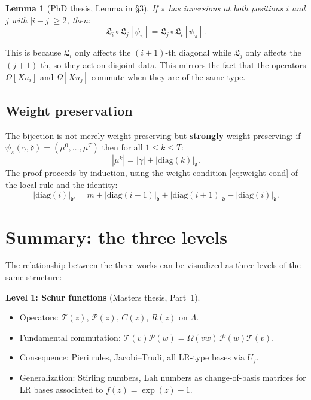 \documentclass[11pt]{article}
\newcommand{\La}{\Lambda}
\newcommand{\diag}{\mathrm{diag}}
\theoremstyle{plain}
\newtheorem{lemma}[theorem]{Lemma}
\theoremstyle{definition}
\begin{document}
\begin{lemma}[PhD thesis, Lemma in \S3]
If $\pi$ has inversions at both positions $i$ and $j$ with $|i-j| \geq 2$, then:
\[
\mathfrak{L}_i \circ \mathfrak{L}_j[\psi_\pi] = \mathfrak{L}_j \circ \mathfrak{L}_i[\psi_\pi].
\]
\end{lemma}
This is because $\mathfrak{L}_i$ only affects the $(i+1)$-th diagonal while $\mathfrak{L}_j$ only affects the $(j+1)$-th, so they act on disjoint data.  This mirrors the fact that the operators $\Omega[Xu_i]$ and $\Omega[Xu_j]$ commute when they are of the same type.

\subsection{Weight preservation}
The bijection is not merely weight-preserving but \textbf{strongly} weight-preserving: if $\psi_\pi(\gamma, \mathfrak{d}) = (\mu^0, \ldots, \mu^T)$ then for all $1 \leq k \leq T$:
\[
|\mu^k| = |\gamma| + |\diag(k)|_\mathfrak{d}.
\]
The proof proceeds by induction, using the weight condition \eqref{eq:weight-cond} of the local rule and the identity:
\[
|\diag(i)|_{\mathfrak{d}'} = m + |\diag(i-1)|_\mathfrak{d} + |\diag(i+1)|_\mathfrak{d} - |\diag(i)|_\mathfrak{d}.
\]

\section{Summary: the three levels}

The relationship between the three works can be visualized as three levels of the same structure:

\medskip

\noindent\textbf{Level 1: Schur functions} (Masters thesis, Part~1).
\begin{itemize}
\item Operators: $\mathcal{T}(z)$, $\mathcal{P}(z)$, $C(z)$, $R(z)$ on $\La$.
\item Fundamental commutation: $\mathcal{T}(v)\mathcal{P}(w) = \Omega(vw)\,\mathcal{P}(w)\mathcal{T}(v)$.
\item Consequence: Pieri rules, Jacobi--Trudi, all LR-type bases via $U_f$.
\item Generalization: Stirling numbers, Lah numbers as change-of-basis matrices for LR bases associated to $f(z) = \exp(z) - 1$.
\end{itemize}
\end{document}
